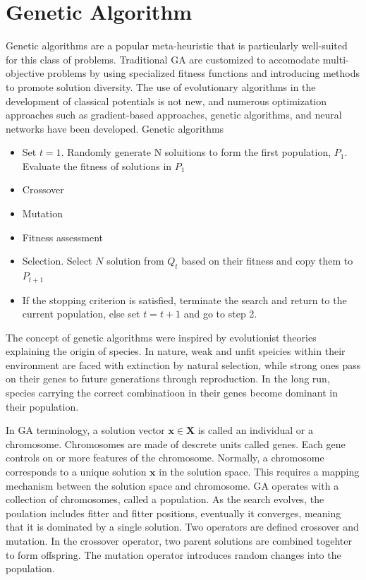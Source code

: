 \section{Genetic Algorithm}

Genetic algorithms are a popular meta-heuristic that is particularly well-suited for this class of problems.  Traditional GA are customized to accomodate multi-objective problems by using specialized fitness functions and introducing methods to promote solution diversity.  The use of evolutionary algorithms in the development of classical potentials is not new, and numerous optimization approaches such as gradient-based approaches, genetic algorithms, and neural networks have been developed.
Genetic algorithms

\begin{itemize}
\item  Set $t=1$.  Randomly generate N soluitions to form the first population, $P_1$.  Evaluate the fitness of solutions in $P_1$
\item Crossover
\item Mutation
\item Fitness assessment
\item Selection.  Select $N$ solution from $Q_t$ based on their fitness and copy them to $P_{t+1}$
\item If the stopping criterion is satisfied, terminate the search and return to the current population, else set $t=t+1$ and go to step 2.
\end{itemize}
The concept of genetic algorithms were inspired by evolutionist theories explaining the origin of species\cite{holland1992_ga}.  In nature, weak and unfit speicies within their environment are faced with extinction by natural selection, while strong ones pass on their genes to future generations through reproduction.  In the long run, species carrying the correct combinatioon in their
    genes become dominant in their population.

In GA terminology, a solution vector $\bm{x}\in\bm{X}$ is called an individual or a chromosome.  Chromosomes are made of descrete units called genes.  Each gene controls on or more features of the chromosome.  Normally, a chromosome corresponds to a unique solution $\bm{x}$ in the solution space.  This requires a mapping mechanism between the solution space and chromosome.  GA operates with a collection of chromosomes, called a population.  As the search evolves, the poulation includes fitter and fitter positions, eventually it converges, meaning that it is dominated by a single solution.  Two operators are defined crossover and mutation.  In the crossover operator, two parent solutions are combined togehter to form offspring.  The mutation operator introduces random changes into the population.

